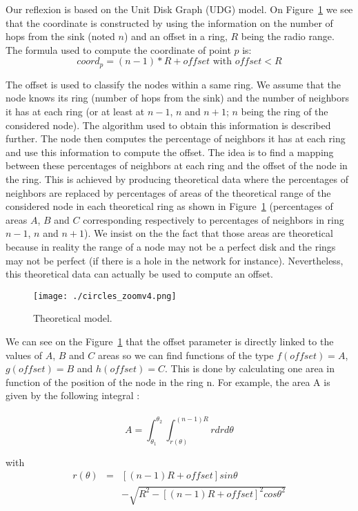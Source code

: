 \documentclass[a4paper]{article}
\begin{document}
Our reflexion is based on the Unit Disk Graph (UDG) model. On Figure~\ref{model}
 we see that the coordinate is constructed by using the information on the number of hops from the sink (noted $n$) and an offset in a ring, $R$ being the radio range. The formula used to compute the coordinate of point $p$ is:
 \[
coord_{p}=(n-1)*R+offset \mbox{ with } offset<R
\]

The offset is used to classify the nodes within a same ring. We assume that the node knows its ring (number of hops from the sink) and the number of neighbors it has at each ring (or at least at $n-1$, $n$ and $n+1$; $n$ being the ring of the considered node). The algorithm used to obtain this information is described further. The node then computes the percentage of neighbors it has at each ring and use this information to compute the offset. The idea is to find a mapping between these percentages of neighbors at each ring and the offset of the node in the ring. This is achieved by producing theoretical data where the percentages of neighbors are replaced by percentages of areas of the theoretical range of the considered node in each theoretical ring as shown in Figure~\ref{model} 
(percentages of areas $A$, $B$ and $C$ corresponding respectively to percentages of neighbors in ring $n-1$, $n$ and $n+1$). We insist on the the fact that those areas are theoretical because in reality the range of a node may not be a perfect disk and the rings may not be perfect (if there is a hole in the network for instance). Nevertheless, this theoretical data can actually be used to compute an offset.

\begin{figure}[!h]
  \centering
  \texttt{[image: ./circles\_zoomv4.png]}
  \caption{Theoretical model.}
  \label{model}
\end{figure}

We can see on the Figure~\ref{model} that the offset parameter is directly linked to the values of $A$, $B$ and $C$ areas so we can find functions of the type $f(offset)=A$, $g(offset)=B$ and $h(offset)=C$. This is done by calculating one area in function of the position of the node in the ring n. For example, the area A is given by the following integral : \\ \\
\[
A=\int_{\theta_{1}}^{\theta_{2}}\int_{r(\theta)}^{(n-1)R}rdrd\theta
\]

with
\begin{eqnarray*}
r(\theta)&=&[(n-1)R+offset]sin{\theta}\\
& & -\sqrt{R^2-[(n-1)R+offset]^2cos{\theta}^2}
\end{eqnarray*}
\end{document}

